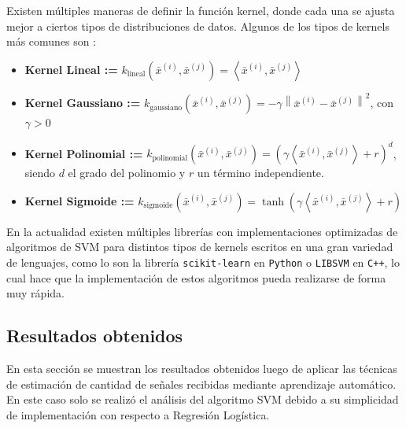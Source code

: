 Existen múltiples maneras de definir la función kernel, donde cada una se ajusta mejor a ciertos tipos de distribuciones de datos. Algunos de los tipos de kernels más comunes son \cite{bib:sklearn_svm}:
\begin{itemize}
  \item \textbf{Kernel Lineal :=} $k_{\textrm{lineal}}(\bar{x}^{(i)},\bar{x}^{(j)})=\left \langle \bar{x}^{(i)},\bar{x}^{(j)} \right \rangle$
  \item \textbf{Kernel Gaussiano :=} $k_{\textrm{gaussiano}}(\bar{x}^{(i)},\bar{x}^{(j)})=-\gamma \left \| \bar{x}^{(i)}-\bar{x}^{(j)} \right \|^2$, con $\gamma>0$
  \item \textbf{Kernel Polinomial :=} $k_{\textrm{polinomial}}(\bar{x}^{(i)},\bar{x}^{(j)})=\left( \gamma \left \langle \bar{x}^{(i)},\bar{x}^{(j)} \right \rangle +r \right)^d$, siendo $d$ el grado del polinomio y $r$ un término independiente.
  \item \textbf{Kernel Sigmoide :=} $k_{\textrm{sigmoide}}(\bar{x}^{(i)},\bar{x}^{(j)})=\tanh{\left(\gamma \left \langle \bar{x}^{(i)},\bar{x}^{(j)} \right \rangle +r\right)}$

\end{itemize}

En la actualidad existen múltiples librerías con implementaciones optimizadas de algoritmos de SVM para distintos tipos de kernels escritos en una gran variedad de lenguajes, como lo son la librería \texttt{scikit-learn} \cite{bib:sklearn_svm} en \texttt{Python} o \texttt{LIBSVM} \cite{bib:LIBSVM} en \texttt{C++}, lo cual hace que la implementación de estos algoritmos pueda realizarse de forma muy rápida.

\subsection{Resultados obtenidos}

En esta sección se muestran los resultados obtenidos luego de aplicar las técnicas de estimación de cantidad de señales recibidas mediante aprendizaje automático. En este caso solo se realizó el análisis del algoritmo SVM debido a su simplicidad de implementación con respecto a Regresión Logística.

